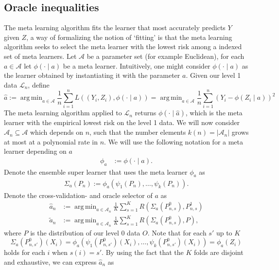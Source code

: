 \documentclass[11pt, a4paper]{article}
\DeclareMathOperator*{\argmin}{arg\,min}
\theoremstyle{definition}
\theoremstyle{remark}
\newcommand{\ml}{k}
\newcommand{\la}{\psi}
\newcommand{\lone}{\mathcal{L}}
\newcommand{\meta}{\phi}
\newcommand{\esl}{\Sigma}
\begin{document}
\subsection{Oracle inequalities}
The meta learning algorithm fits the learner that most accurately predicts $ Y $ given $ Z $, a way of formalizing the notion of `fitting' is that the meta learning algorithm seeks to select the meta learner with the lowest risk among a indexed set of meta learners. Let $ \mathcal{A} $ be a parameter set (for example Euclidean), for each $ a \in \mathcal{A} $ let $ \meta( \cdot \mid a) $ be a meta learner. Intuitively, one might consider $ \meta( \cdot \mid a) $ as the learner obtained by instantiating it with the parameter $ a $. Given our level 1 data $ \lone_{n} $, define 
$$ \hat{a} := \argmin_{a \in \mathcal{A}} \frac{1}{n} \sum_{i = 1}^{n} L((Y_i, Z_i), \meta( \cdot \mid a)) = \argmin_{a \in \mathcal{A}} \frac{1}{n} \sum_{i = 1}^{n} (Y_i - \meta(Z_i \mid a))^2 $$
The meta learning algorithm applied to $ \lone_{n} $ returns $ \meta(\cdot \mid \hat{a}) $, which is the meta learner with the empirical lowest risk on the level 1 data. We will now consider $ \mathcal{A}_n \subseteq \mathcal{A} $ which depends on $ n $, such that the number elements $ \ml(n) = |\mathcal{A}_{n}| $ grows at most at a polynomial rate in $ n $. We will use the following notation for a meta learner depending on $ a $ 
\begin{align*}
    \meta_{ a } &:= \meta(\cdot \mid a ).
\end{align*}
Denote the ensemble super learner that uses the meta learner $ \meta_{ a } $ as 
\begin{align*}
    \esl_{a}(P_{n}) := \meta_{a}(\la_1(P_{n}), \ldots, \la_k(P_{n})).
\end{align*}
Denote the cross-validation- and oracle selector of $ a $ as 
\begin{align*}
    \hat{a}_n &:= \argmin_{a \in \mathcal{A}_{n}} \frac{1}{K} \sum_{s = 1}^{K} R(\esl_{a}(P_{n, s}^{0}), P_{n, s}^{1}) \\
    \tilde{a}_n &:= \argmin_{a \in \mathcal{A}_n} \frac{1}{K} \sum_{s = 1}^{K} R(\esl_{a}(P_{n, s}^{0}) , P),
\end{align*}
where $ P $ is the distribution of our level 0 data $ O $. Note that for each $ s' $ up to $ K $ 
$$ \esl_a(P_{n, s'}^{0})(X_i) = \meta_{a}(\la_{1}(P_{n, s'}^{0})(X_i) , \dots , \la_{\ml}(P_{n, s'}^{0})(X_i) ) = \meta_{a}(Z_i) $$ 
holds for each $ i $ when $ s(i) = s' $. By using the fact that the $ K $ folds are disjoint and exhaustive, we can express $ \hat{a}_n $ as  
\end{document}
